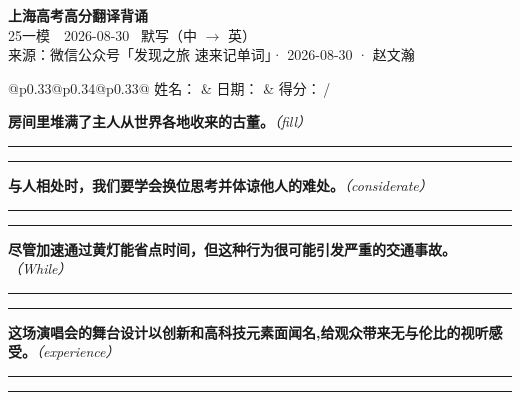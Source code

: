 \documentclass[11pt,a4paper]{article}
\newcommand{\num}[1]{\makebox[1.9em][r]{#1.}\hspace{0.3em}}
\newcommand{\wline}{\noindent\rule{\linewidth}{0.4pt}}
\newcommand{\prompt}[1]{\emph{\textcolor{tipblue}{\small（#1）}}}
\begin{document}
\pagestyle{plain}
\begin{center}
{\LARGE\bfseries 上海高考高分翻译背诵 }\\[0.25em]
{\large 25一模　2026-08-30 \quad\ 默写（中 $\to$ 英）}\\[0.35em]
{\footnotesize 来源：微信公众号「发现之旅 速来记单词」· 2026-08-30 · 赵文瀚}
\end{center}

\vspace{0.4em}
\noindent\begin{tabular}{@{}p{0.33\textwidth}@{}p{0.34\textwidth}@{}p{0.33\textwidth}@{}}
姓名：\underline{\hspace{2.0cm}} & 日期：\underline{\hspace{2.0cm}} & 得分：\underline{\hspace{1.4cm}}\,/ \\
\end{tabular}

\vspace{0.5em}

\vspace{0.8em}
\num{1}\textbf{房间里堆满了主人从世界各地收来的古董。}\prompt{fill}

\vspace{0.3em}

\wline\vspace{0.3em}
\wline

\num{2}\textbf{与人相处时，我们要学会换位思考并体谅他人的难处。}\prompt{considerate}

\vspace{0.3em}

\wline\vspace{0.3em}
\wline

\num{3}\textbf{尽管加速通过黄灯能省点时间，但这种行为很可能引发严重的交通事故。}\prompt{While}

\vspace{0.3em}

\wline\vspace{0.3em}
\wline

\num{4}\textbf{这场演唱会的舞台设计以创新和高科技元素面闻名,给观众带来无与伦比的视听感受。}\prompt{experience}

\vspace{0.3em}

\wline\vspace{0.3em}
\wline
\end{document}
